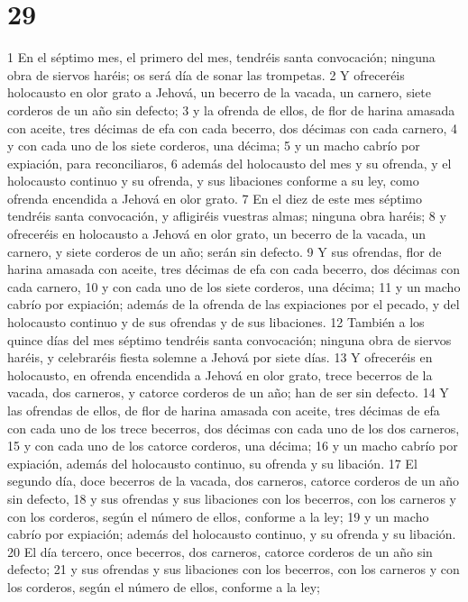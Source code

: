 \chapter{29}


1 En el séptimo mes, el primero del mes, tendréis santa convocación; ninguna obra de siervos haréis; os será día de sonar las trompetas.
2 Y ofreceréis holocausto en olor grato a Jehová, un becerro de la vacada, un carnero, siete corderos de un año sin defecto;
3 y la ofrenda de ellos, de flor de harina amasada con aceite, tres décimas de efa   con cada becerro, dos décimas con cada carnero,
4 y con cada uno de los siete corderos, una décima;
5 y un macho cabrío por expiación, para reconciliaros,
6 además del holocausto del mes y su ofrenda, y el holocausto continuo y su ofrenda, y sus libaciones conforme a su ley, como ofrenda encendida a Jehová en olor grato.
7 En el diez de este mes séptimo tendréis santa convocación, y afligiréis vuestras almas; ninguna obra haréis;
8 y ofreceréis en holocausto a Jehová en olor grato, un becerro de la vacada, un carnero, y siete corderos de un año; serán sin defecto.
9 Y sus ofrendas, flor de harina amasada con aceite, tres décimas de efa   con cada becerro, dos décimas con cada carnero,
10 y con cada uno de los siete corderos, una décima;
11 y un macho cabrío por expiación; además de la ofrenda de las expiaciones por el pecado, y del holocausto continuo y de sus ofrendas y de sus libaciones.
12 También a los quince días del mes séptimo tendréis santa convocación; ninguna obra de siervos haréis, y celebraréis fiesta solemne a Jehová por siete días. 
13 Y ofreceréis en holocausto, en ofrenda encendida a Jehová en olor grato, trece becerros de la vacada, dos carneros, y catorce corderos de un año; han de ser sin defecto.
14 Y las ofrendas de ellos, de flor de harina amasada con aceite, tres décimas de efa   con cada uno de los trece becerros, dos décimas con cada uno de los dos carneros,
15 y con cada uno de los catorce corderos, una décima;
16 y un macho cabrío por expiación, además del holocausto continuo, su ofrenda y su libación.
17 El segundo día, doce becerros de la vacada, dos carneros, catorce corderos de un año sin defecto,
18 y sus ofrendas y sus libaciones con los becerros, con los carneros y con los corderos, según el número de ellos, conforme a la ley;
19 y un macho cabrío por expiación; además del holocausto continuo, y su ofrenda y su libación.
20 El día tercero, once becerros, dos carneros, catorce corderos de un año sin defecto;
21 y sus ofrendas y sus libaciones con los becerros, con los carneros y con los corderos, según el número de ellos, conforme a la ley;
